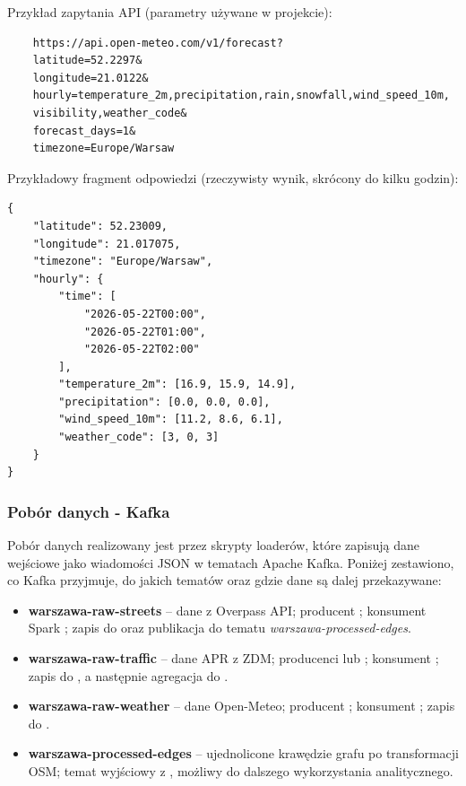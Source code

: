 \documentclass[12pt]{article}
\begin{document}
\begin{itemize}
        Przykład zapytania API (parametry używane w projekcie):
        \begin{tcolorbox}
        \begin{verbatim}
    https://api.open-meteo.com/v1/forecast?
    latitude=52.2297&
    longitude=21.0122&
    hourly=temperature_2m,precipitation,rain,snowfall,wind_speed_10m,
    visibility,weather_code&
    forecast_days=1&
    timezone=Europe/Warsaw
        \end{verbatim}
        \end{tcolorbox}

        Przykładowy fragment odpowiedzi (rzeczywisty wynik, skrócony do kilku godzin):
        \begin{tcolorbox}
        \begin{verbatim}
{
    "latitude": 52.23009,
    "longitude": 21.017075,
    "timezone": "Europe/Warsaw",
    "hourly": {
        "time": [
            "2026-05-22T00:00",
            "2026-05-22T01:00",
            "2026-05-22T02:00"
        ],
        "temperature_2m": [16.9, 15.9, 14.9],
        "precipitation": [0.0, 0.0, 0.0],
        "wind_speed_10m": [11.2, 8.6, 6.1],
        "weather_code": [3, 0, 3]
    }
}
        \end{verbatim}
        \end{tcolorbox}
\end{itemize}

\subsubsection{Pobór danych - Kafka}
Pobór danych realizowany jest przez skrypty loaderów, które zapisują dane wejściowe jako
wiadomości JSON w tematach Apache Kafka. Poniżej zestawiono, co Kafka przyjmuje, do jakich
tematów oraz gdzie dane są dalej przekazywane:
\begin{itemize}
    \item \textbf{warszawa-raw-streets} -- dane z Overpass API; producent
    ; konsument Spark
    ; zapis do
     oraz publikacja do tematu
    \textit{warszawa-processed-edges}.
    \item \textbf{warszawa-raw-traffic} -- dane APR z ZDM; producenci
     lub ;
    konsument ; zapis do
    , a następnie agregacja
     do
    .
    \item \textbf{warszawa-raw-weather} -- dane Open-Meteo; producent
    ; konsument
    ; zapis do
    .
    \item \textbf{warszawa-processed-edges} -- ujednolicone krawędzie grafu po transformacji OSM;
    temat wyjściowy z , możliwy do dalszego
    wykorzystania analitycznego.
\end{itemize}
\end{document}
